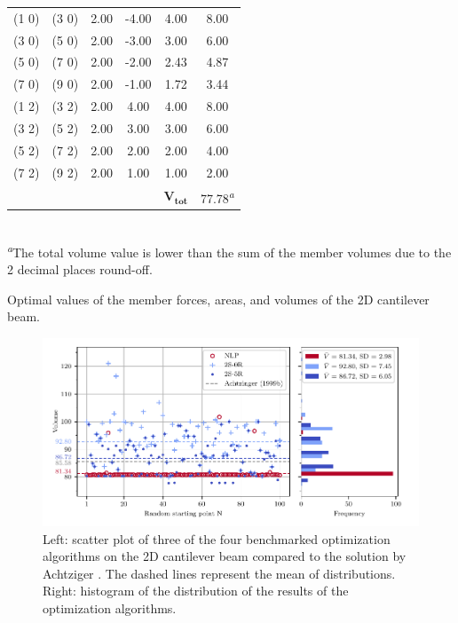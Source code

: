 \begin{margintable}
{\begin{tabular}{ccSSSS}
    (1 0)  & (3 0)  & 2.00 & -4.00 & 4.00 & 8.00 \\
    (3 0)  & (5 0)  & 2.00 & -3.00 & 3.00 & 6.00 \\
    (5 0)  & (7 0)  & 2.00 & -2.00 & 2.43 & 4.87 \\
    (7 0)  & (9 0)  & 2.00 & -1.00 & 1.72 & 3.44 \\
    (1 2)  & (3 2)  & 2.00 & 4.00  & 4.00 & 8.00 \\
    (3 2)  & (5 2)  & 2.00 & 3.00  & 3.00 & 6.00 \\
    (5 2)  & (7 2)  & 2.00 & 2.00  & 2.00 & 4.00 \\
    (7 2)  & (9 2)  & 2.00 & 1.00  & 1.00 & 2.00 \\ \midrule
     &
       &
       &
       &
       &
      77.78\textsuperscript{\emph{a}} \\ \bottomrule
    \end{tabular}}
    \\
    \scriptsize{\textsuperscript{\emph{a}}The total volume value is lower than the sum of the member volumes due to the 2 decimal places round-off.}
    \caption{Optimal values of the member forces, areas, and volumes of the 2D cantilever beam.}
    \label{tab:04_2d_cant_opt}
\end{margintable}

\begin{figure}
    \centering
    \includegraphics{figures/04_TTO_improvements/13_convergence_Achtz/cant_ach-conv.pdf}
    \caption{Left: scatter plot of three of the four benchmarked optimization algorithms on the 2D cantilever beam compared to the solution by Achtziger \cite{achtziger_local_1999b}. The dashed lines represent the mean of distributions. Right: histogram of the distribution of the results of the optimization algorithms.}
    \label{fig:04_2d_cant_convergence}
\end{figure}

